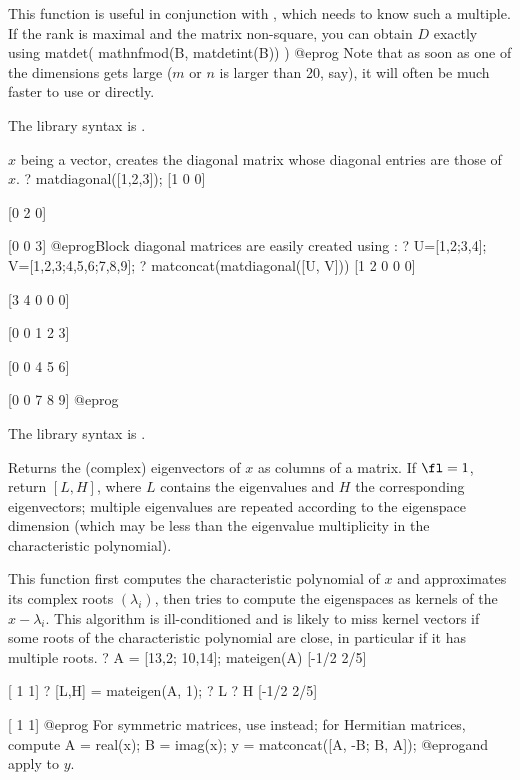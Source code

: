 This function is useful in conjunction with , which needs to
know such a multiple. If the rank is maximal and the matrix non-square,
you can obtain $D$ exactly using
\bprog
  matdet( mathnfmod(B, matdetint(B)) )
@eprog\noindent
Note that as soon as one of the dimensions gets large ($m$ or $n$ is larger
than 20, say), it will often be much faster to use  or
 directly.

The library syntax is .

\label{se:matdiagonal}
$x$ being a vector, creates the diagonal matrix
whose diagonal entries are those of $x$.
\bprog
? matdiagonal([1,2,3]);
[1 0 0]

[0 2 0]

[0 0 3]
@eprog\noindent Block diagonal matrices are easily created using
:
\bprog
? U=[1,2;3,4]; V=[1,2,3;4,5,6;7,8,9];
? matconcat(matdiagonal([U, V]))
[1 2 0 0 0]

[3 4 0 0 0]

[0 0 1 2 3]

[0 0 4 5 6]

[0 0 7 8 9]
@eprog

The library syntax is .

\label{se:mateigen}
Returns the (complex) eigenvectors of $x$ as columns of a matrix.
If $\fl=1$, return $[L,H]$, where $L$ contains the
eigenvalues and $H$ the corresponding eigenvectors; multiple eigenvalues are
repeated according to the eigenspace dimension (which may be less
than the eigenvalue multiplicity in the characteristic polynomial).

This function first computes the characteristic polynomial of $x$ and
approximates its complex roots $(\lambda_i)$, then tries to compute the
eigenspaces as kernels of the $x - \lambda_i$. This algorithm is
ill-conditioned and is likely to miss kernel vectors if some roots of the
characteristic polynomial are close, in particular if it has multiple roots.
\bprog
? A = [13,2; 10,14]; mateigen(A)
[-1/2 2/5]

[   1   1]
? [L,H] = mateigen(A, 1);
? L
? H
[-1/2 2/5]

[   1   1]
@eprog\noindent
For symmetric matrices, use  instead; for Hermitian matrices,
compute
\bprog
 A = real(x);
 B = imag(x);
 y = matconcat([A, -B; B, A]);
@eprog\noindent and apply  to $y$.

